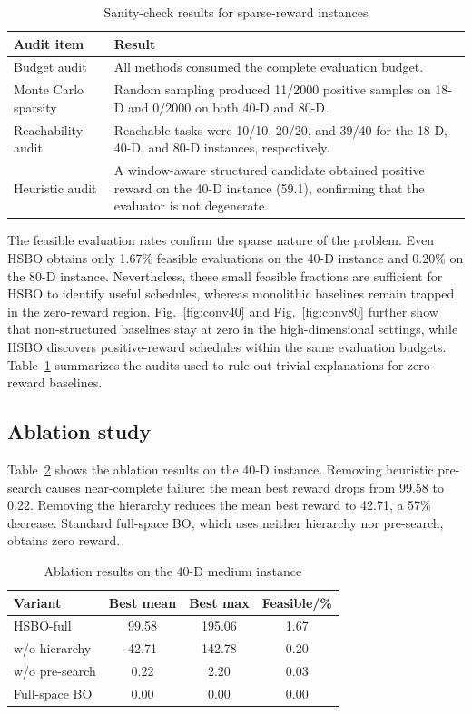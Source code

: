 \documentclass[twocolumn]{article}
\begin{document}
\begin{table}[t]
\centering
\caption{Sanity-check results for sparse-reward instances}
\label{tab:sanity}
\small
\begin{tabular}{p{}p{}}
\toprule
Audit item & Result \\
\midrule
Budget audit & All methods consumed the complete evaluation budget. \\
Monte Carlo sparsity & Random sampling produced 11/2000 positive samples on 18-D and 0/2000 on both 40-D and 80-D. \\
Reachability audit & Reachable tasks were 10/10, 20/20, and 39/40 for the 18-D, 40-D, and 80-D instances, respectively. \\
Heuristic audit & A window-aware structured candidate obtained positive reward on the 40-D instance (59.1), confirming that the evaluator is not degenerate. \\
\bottomrule
\end{tabular}
\end{table}

The feasible evaluation rates confirm the sparse nature of the problem. Even HSBO obtains only 1.67\% feasible evaluations on the 40-D instance and 0.20\% on the 80-D instance. Nevertheless, these small feasible fractions are sufficient for HSBO to identify useful schedules, whereas monolithic baselines remain trapped in the zero-reward region. Fig.~\ref{fig:conv40} and Fig.~\ref{fig:conv80} further show that non-structured baselines stay at zero in the high-dimensional settings, while HSBO discovers positive-reward schedules within the same evaluation budgets. Table~\ref{tab:sanity} summarizes the audits used to rule out trivial explanations for zero-reward baselines.

\subsection{Ablation study}
Table~\ref{tab:ablation} shows the ablation results on the 40-D instance. Removing heuristic pre-search causes near-complete failure: the mean best reward drops from 99.58 to 0.22. Removing the hierarchy reduces the mean best reward to 42.71, a 57\% decrease. Standard full-space BO, which uses neither hierarchy nor pre-search, obtains zero reward.

\begin{table}[t]
\centering
\caption{Ablation results on the 40-D medium instance}
\label{tab:ablation}
\begin{tabular}{lccc}
\toprule
Variant & Best mean & Best max & Feasible/\% \\
\midrule
HSBO-full & 99.58 & 195.06 & 1.67 \\
w/o hierarchy & 42.71 & 142.78 & 0.20 \\
w/o pre-search & 0.22 & 2.20 & 0.03 \\
Full-space BO & 0.00 & 0.00 & 0.00 \\
\bottomrule
\end{tabular}
\end{table}
\end{document}
